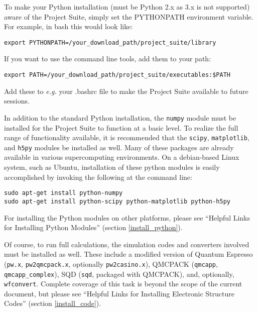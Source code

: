 \documentclass[oneside,11pt]{memoir}
\numberwithin{equation}{section}
\begin{document}
To make your Python installation (must be Python 2.x as 3.x is not supported) 
aware of the Project Suite, simply set the 
PYTHONPATH environment variable.  For example, in bash this would look like:
\begin{shaded}
\begin{verbatim}
export PYTHONPATH=/your_download_path/project_suite/library
\end{verbatim}
\end{shaded}
If you want to use the command line tools, add them to your path:
\begin{shaded}
\begin{verbatim}
export PATH=/your_download_path/project_suite/executables:$PATH
\end{verbatim}
\end{shaded}
Add these to \emph{e.g.} your .bashrc file to make the Project Suite available 
to future sessions.

In addition to the standard Python installation, the \texttt{numpy} module must 
be installed for the Project Suite to function at a basic level.  To realize 
the full range of functionality available, it is recommended that the 
\texttt{scipy}, \texttt{matplotlib}, and \texttt{h5py} modules be installed as 
well.  Many of these packages are already available in various supercomputing 
environments.  On a debian-based Linux system, such as Ubuntu, installation of 
these python modules is easily accomplished by invoking the following at the 
command line:
\begin{shaded}
\begin{verbatim}
sudo apt-get install python-numpy
sudo apt-get install python-scipy python-matplotlib python-h5py 
\end{verbatim}
\end{shaded}
For installing the Python modules on other platforms, please see 
``Helpful Links for Installing Python Modules'' (section \ref{install_python}).

Of course, to run full calculations, the simulation codes and converters 
involved must be installed as well.  These include a modified version of 
Quantum Espresso (\texttt{pw.x}, \texttt{pw2qmcpack.x}, optionally 
\texttt{pw2casino.x}), QMCPACK (\texttt{qmcapp}, \texttt{qmcapp\_complex}), 
SQD (\texttt{sqd}, packaged with QMCPACK), and, optionally, \texttt{wfconvert}.  
Complete coverage of this task is beyond the scope of the current document, but 
please see ``Helpful Links for Installing Electronic Structure Codes'' 
(section \ref{install_code}).
\end{document}
